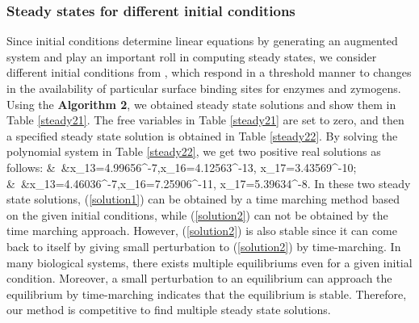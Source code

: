 \subsubsection*{Steady states for different initial
conditions} \label{sec:sa}

Since initial conditions determine linear equations by generating an
augmented system and play an important roll in computing steady
states, we consider different initial conditions from \cite{KF01},
which respond in a threshold manner to changes in the availability
of particular surface binding sites for enzymes and
zymogens. %
Using the {\bf
Algorithm 2}, %
 we obtained
steady state solutions and show them in Table \ref{steady21}. The
free variables in Table \ref{steady21} are set to zero, and then a
specified steady state solution is obtained in Table \ref{steady22}.
By solving the polynomial system in Table \ref{steady22}, we get two
positive real solutions as follows: \bes &\
&x_{13}=4.99656^{-7},x_{16}=4.12563^{-13},
x_{17}=3.43569^{-10};\label{solution1}\\ &\
&x_{13}=4.46036^{-7},x_{16}=7.25906\times10^{-11},
x_{17}=5.39634\times10^{-8}.\label{solution2}
 \ees
 In these two steady state solutions, (\ref{solution1}) can be
 obtained by a time marching method based on the given initial conditions, while (\ref{solution2}) can not
 be obtained by the time marching approach.
 However, (\ref{solution2}) is also stable since it can come back to itself by
giving small perturbation to (\ref{solution2}) by time-marching. In
many biological systems, there exists multiple equilibriums even for
a given initial condition. Moreover, a small perturbation to an
equilibrium can approach the equilibrium by time-marching indicates
 that the equilibrium is stable. Therefore, our method is
 competitive to find multiple steady state solutions.

